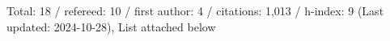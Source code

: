 Total: 18 / refereed: 10 / first author: 4 / citations: 1,013 / h-index: 9 (Last updated: 2024-10-28), List attached below